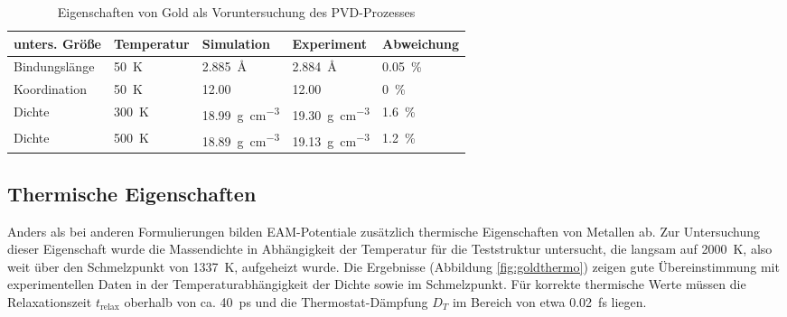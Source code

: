 \begin{table}[hbtp]
  \caption[Eigenschaften von Gold]{Eigenschaften von Gold als Voruntersuchung des PVD-Prozesses}
  \label{tab:goldpreresults}
  \begin{tabularx}{\textwidth}{|lXXXX|}
    \hline
    \textbf{unters. Größe} & \textbf{Temperatur} & \textbf{Simulation} & \textbf{Experiment} & \textbf{Abweichung}\\
    \hline
    Bindungslänge  &  \SI{50}{\kelvin}   &  \SI{2.885}{\angstrom}                    &  \SI{2.884}{\angstrom}                    &  \SI{0.05}{\percent}  \\
    Koordination   &  \SI{50}{\kelvin}   &  \SI{12.00}{}                             &  \SI{12.00}{}                             &  \SI{0}{\percent}     \\
    Dichte         &  \SI{300}{\kelvin}  &  \SI{18.99}{\gram\per\cubic\centi\meter}  &  \SI{19.30}{\gram\per\cubic\centi\meter}  &  \SI{1.6}{\percent}   \\
    Dichte         &  \SI{500}{\kelvin}  &  \SI{18.89}{\gram\per\cubic\centi\meter}  &  \SI{19.13}{\gram\per\cubic\centi\meter}  &  \SI{1.2}{\percent}   \\
    \hline
  \end{tabularx}
\end{table}


\subsection{Thermische Eigenschaften}

Anders als bei anderen Formulierungen bilden EAM-Potentiale zusätzlich thermische Eigenschaften von Metallen ab.
Zur Untersuchung dieser Eigenschaft wurde die Massendichte in Abhängigkeit der Temperatur für die Teststruktur untersucht, die langsam auf \SI{2000}{\kelvin}, also weit über den Schmelzpunkt von \SI{1337}{\kelvin}, aufgeheizt wurde.
Die Ergebnisse (Abbildung \ref{fig:goldthermo}) zeigen gute Übereinstimmung mit experimentellen Daten in der Temperaturabhängigkeit der Dichte sowie im Schmelzpunkt.
Für korrekte thermische Werte müssen die Relaxationszeit $t_\text{relax}$ oberhalb von ca. \SI{40}{\pico\second} und die Thermostat-Dämpfung $D_T$ im Bereich von etwa \SI{0.02}{\femto\second} liegen.

